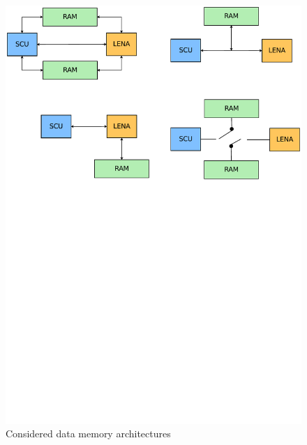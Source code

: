 \begin{figure}[h]
  \centering
  \includegraphics[width=\textwidth,clip,trim=0 17cm 0 0]
                  {fig/disc/memarch.pdf}
  \caption[Data Memory Architecturres]{Considered data memory architectures}
  \label{fig:disc-memarch}
\end{figure}
